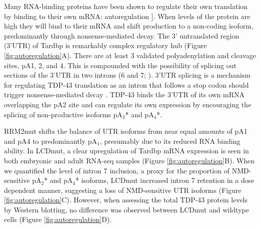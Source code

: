 Many RNA-binding proteins have been shown to regulate their own translation by binding to their own mRNA: autoregulation \citep{Lareau2007,Wollerton2004}]. When levels of the protein are high they will bind to their mRNA and shift production to a non-coding isoform, predominantly through nonsense-mediated decay.
The 3' untranslated region (3'UTR) of Tardbp is remarkably complex regulatory hub (Figure \ref{fig:autoregulation}A). There are at least 3 validated polyadenylation and cleavage sites, pA1, 2, and 4. This is compounded with the possibility of splicing out sections of the 3'UTR in two introns (6 and 7; \citep{Koyama2016}). 3'UTR splicing is a mechanism for regulating TDP-43 translation as an intron that follows a stop codon should trigger nonsense-mediated decay \citep{McGlincy2008-wh}.  TDP-43 binds the 3'UTR of its own mRNA overlapping the pA2 site  \citep{Polymenidou2011,Tollervey2011} and can regulate its own expression by encouraging the splicing of non-productive isoforms pA$_2$* and pA$_4$*. 

RRM2mut shifts the balance of UTR isoforms from near equal amounts of pA1 and pA4 to predominantly pA$_1$, presumably due to its reduced RNA binding ability.  In LCDmut, a clear upregulation of Tardbp mRNA expression is seen in both embryonic and adult RNA-seq samples (Figure \ref{fig:autoregulation}B). When we quantified the level of intron 7 inclusion, a proxy for the proportion of NMD-sensitive pA$_2$* and pA$_4$* isoforms, LCDmut increased intron 7 retention in a dose dependent manner, suggesting a loss of NMD-sensitive UTR isoforms (Figure \ref{fig:autoregulation}C). However, when assessing the total TDP-43 protein levels by Western blotting, no difference was observed between LCDmut and wildtype cells (Figure \ref{fig:autoregulation}D).



